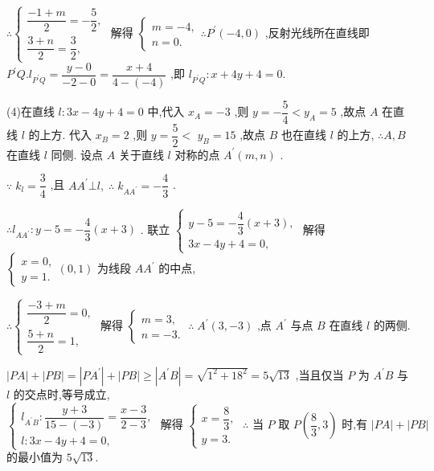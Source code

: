 $\therefore \left\{  \begin{array}{l} \dfrac{-1 + m}{2} =  - \dfrac{5}{2}, \\  \dfrac{3 + n}{2} = \dfrac{3}{2}, \end{array}\right.$ 解得 $\left\{  \begin{array}{l} m =  - 4, \\  n = 0. \end{array}\right. \therefore {P}^{\prime }\left( {-4,0}\right)$ ,反射光线所在直线即 ${P}^{\prime }Q.{l}_{{P}^{\prime }Q} = \dfrac{y - 0}{-2 - 0} = \dfrac{x + 4}{4 - \left( {-4}\right) }$ ,即 ${l}_{{P}^{\prime }Q} : x + {4y} + 4 = 0.$

(4)在直线 $l : {3x} - {4y} + 4 = 0$ 中,代入 ${x}_{A} =  - 3$ ,则 $y =  - \dfrac{5}{4} < {y}_{A} = 5$ ,故点 $A$ 在直线 $l$ 的上方. 代入 ${x}_{B} = 2$ ,则 $y = \dfrac{5}{2} <$  ${y}_{B} = {15}$ ,故点 $B$ 也在直线 $l$ 的上方, $\therefore A,B$ 在直线 $l$ 同侧. 设点 $A$ 关于直线 $l$ 对称的点 ${A}^{\prime }\left( {m,n}\right)$ .

$\because \;{k}_{l} = \dfrac{3}{4}$ ,且 $A{A}^{\prime } \bot  l,\;\therefore \;{k}_{A{A}^{\prime }} =  - \dfrac{4}{3}$ .

$\therefore {l}_{A{A}^{\prime }} : y - 5 =  - \dfrac{4}{3}\left( {x + 3}\right)$ . 联立 $\left\{  \begin{array}{l} y - 5 =  - \dfrac{4}{3}\left( {x + 3}\right) , \\  {3x} - {4y} + 4 = 0, \end{array}\right.$ 解得 $\left\{  \begin{array}{l} x = 0, \\  y = 1. \end{array}\right. \left( {0,1}\right)$ 为线段 $A{A}^{\prime }$ 的中点,

$\therefore \left\{  {\begin{array}{l} \dfrac{-3 + m}{2} = 0, \\  \dfrac{5 + n}{2} = 1, \end{array}\text{ 解得 }\left\{  {\begin{array}{l} m = 3, \\  n =  - 3. \end{array}\;\therefore \;{A}^{\prime }\left( {3, - 3}\right) \text{ ,点 }{A}^{\prime }\text{ 与点 }B\text{ 在直线 }l\text{ 的两侧. }}\right. }\right.$

$\left| {PA}\right|  + \left| {PB}\right|  = \left| {P{A}^{\prime }}\right|  + \left| {PB}\right|  \geq  \left| {{A}^{\prime }B}\right|  = \sqrt{{1}^{2} + {18}^{2}} = 5\sqrt{13}$ ,当且仅当 $P$ 为 ${A}^{\prime }B$ 与 $l$ 的交点时,等号成立, $\left\{  {\begin{array}{l} {l}_{{A}^{\prime }B} : \dfrac{y + 3}{{15} - \left( {-3}\right) } = \dfrac{x - 3}{2 - 3}, \\  l : {3x} - {4y} + 4 = 0, \end{array}\text{ 解得 }\left\{  {\begin{array}{l} x = \dfrac{8}{3}, \\  y = 3. \end{array}\;\therefore \text{ 当 }P\text{ 取 }P\left( {\dfrac{8}{3},3}\right) \text{ 时,有 }\left| {PA}\right|  + \left| {PB}\right| }\right. }\right.$ 的最小值为 $5\sqrt{13}.$

